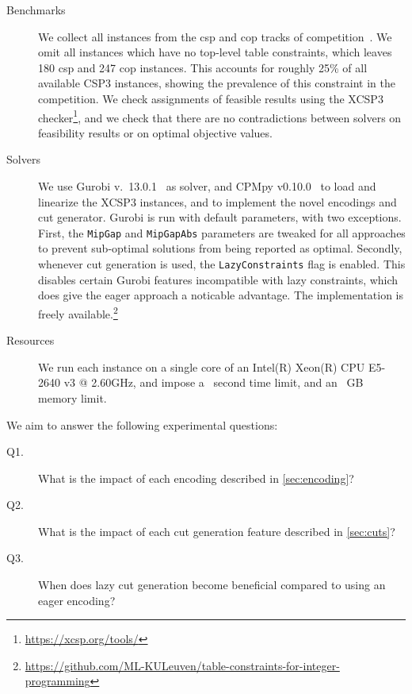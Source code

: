 \documentclass[a4paper,UKenglish,cleveref,autoref,thm-restate]{lipics-v2021}
\begin{document}
\begin{description}
    \item[Benchmarks] We collect all instances from the \gls{csp} and \acrshort{cop} tracks of \XCSPYears competition~\cite{audemard2025proceedings2025xcsp3competition}.
    We omit all instances which have no top-level table constraints, which leaves 180 \gls{csp} and 247 \gls{cop} instances. This accounts for roughly 25\% of all available CSP3 instances, showing the prevalence of this constraint in the competition. We check assignments of feasible results using the XCSP3 checker\footnote{\url{https://xcsp.org/tools/}}, and we check that there are no contradictions between solvers on feasibility results or on optimal objective values.
    \item[Solvers] We use Gurobi v.~13.0.1~\cite{gurobi} as \milp solver, and CPMpy v0.10.0~\cite{guns2019increasing} to load and linearize the XCSP3 instances, and to implement the novel encodings and cut generator. Gurobi is run with default parameters, with two exceptions. First, the \texttt{MipGap} and \texttt{MipGapAbs} parameters are tweaked for all approaches to prevent sub-optimal solutions from being reported as optimal. Secondly, whenever cut generation is used, the \texttt{LazyConstraints} flag is enabled. This disables certain Gurobi features incompatible with lazy constraints, which does give the eager approach a noticable advantage. The implementation is freely available.\footnote{\url{https://github.com/ML-KULeuven/table-constraints-for-integer-programming}}
    \item[Resources] We run each instance on a single core of an Intel(R) Xeon(R) CPU E5-2640 v3 @ 2.60GHz, and impose a \timeout~second time limit, and an \memout~GB memory limit.
\end{description}

\noindent We aim to answer the following experimental questions:

\begin{description}
    \item[Q1.] What is the impact of each encoding described in \cref{sec:encoding}?
    \item[Q2.] What is the impact of each cut generation feature described in \cref{sec:cuts}?
    \item[Q3.] When does lazy cut generation become beneficial compared to using an eager encoding?
\end{description}
\end{document}
